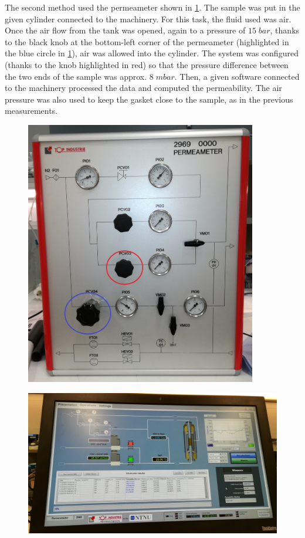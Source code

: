 \documentclass[10pt, a4paper]{amsart}
\begin{document}
The second method used the permeameter shown in \cref{f:perm2}.
The sample was put in the given cylinder connected to the machinery. For this task, the fluid used was air. Once the air flow from the tank was opened, again to a pressure of $15\;bar$, thanks to the black knob at the bottom-left corner of the permeameter (highlighted in the blue circle in \cref{f:perm2}), air was allowed into the cylinder. The system was configured (thanks to the knob highlighted in red) so that the pressure difference between the two ends of the sample was approx. $8\;mbar$. Then, a given software connected to the machinery processed the data and computed the permeability. The air pressure was also used to keep the gasket close to the sample, as in the previous measurements.

\begin{figure}[!h]
    \centering
    \begin{minipage}{0.5\textwidth}
        \includegraphics[width=0.9\textwidth]{perm2.jpg}
        \label{f:perm2}
    \end{minipage}\hfill
    \begin{minipage}{0.5\textwidth}
        \includegraphics[width=\textwidth]{perm2_2.jpeg}

\end{minipage}
\end{figure}
\end{document}
